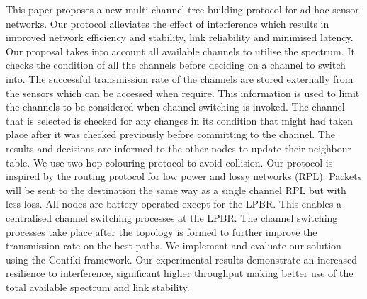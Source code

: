 This paper proposes a new multi-channel tree building protocol for ad-hoc sensor networks. %
Our protocol alleviates the effect of interference which results in improved network efficiency and stability, link reliability and minimised latency. 
        Our proposal takes into account all available channels to utilise the spectrum. It checks the condition of all the channels before deciding on a channel to switch into. The successful transmission rate of the channels are stored externally from the sensors which can be accessed when require. This information is used to limit the channels to be considered when channel switching is invoked. The channel that is selected is checked for any changes in its condition that might had taken place after it was checked previously before committing to the channel. The results and decisions are informed to the other nodes to update their neighbour table. We use two-hop colouring protocol to avoid collision. 
	Our protocol is inspired by the routing protocol for low power and lossy networks (RPL). Packets will be sent to the destination the same way as a single channel RPL but with less loss. 
	All nodes are battery operated except for the LPBR. This enables a centralised channel switching processes at the LPBR. The channel switching processes take place after the topology is formed to further improve the transmission rate on the best paths.
	We implement and evaluate our solution using the Contiki framework. Our experimental results demonstrate an increased resilience to interference, significant higher throughput making better use of the total available spectrum and link stability. 
